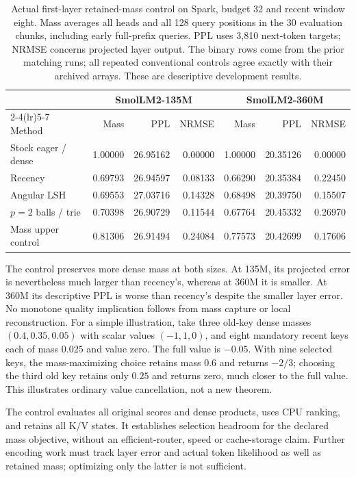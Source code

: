 \documentclass[11pt]{article}
\begin{document}
\begin{table}[htbp]
\centering
\small
\caption{Actual first-layer retained-mass control on Spark, budget 32 and
recent window eight. Mass averages all heads and all 128 query positions in
the 30 evaluation chunks, including early full-prefix queries. PPL uses 3,810
next-token targets; NRMSE concerns projected layer output. The binary rows
come from the prior matching runs; all repeated conventional controls agree
exactly with their archived arrays. These are descriptive development results.}
\begin{tabular}{lrrrrrr}
\toprule
 & \multicolumn{3}{c}{SmolLM2-135M} & \multicolumn{3}{c}{SmolLM2-360M}\\
\cmidrule(lr){2-4}\cmidrule(lr){5-7}
Method & Mass & PPL & NRMSE & Mass & PPL & NRMSE\\
\midrule
Stock eager / dense & 1.00000 & 26.95162 & 0.00000 & 1.00000 & 20.35126 & 0.00000\\
Recency & 0.69793 & 26.94597 & 0.08133 & 0.66290 & 20.35384 & 0.22450\\
Angular LSH & 0.69553 & 27.03716 & 0.14328 & 0.68498 & 20.39750 & 0.15507\\
\(p=2\) balls / trie & 0.70398 & 26.90729 & 0.11544 & 0.67764 & 20.45332 & 0.26970\\
Mass upper control & 0.81306 & 26.91494 & 0.24084 & 0.77573 & 20.42699 & 0.17606\\
\bottomrule
\end{tabular}
\label{tab:actual-oracle}
\end{table}

The control preserves more dense mass at both sizes. At 135M, its projected
error is nevertheless much larger than recency's, whereas at 360M it is smaller.
At 360M its descriptive PPL is worse than recency's despite the smaller layer
error. No monotone quality implication follows from mass capture or local
reconstruction. For a simple illustration, take three old-key dense masses
\((0.4,0.35,0.05)\) with scalar values \((-1,1,0)\), and eight mandatory recent
keys each of mass \(0.025\) and value zero. The full value is \(-0.05\).
With nine selected keys, the mass-maximizing choice retains mass \(0.6\) and
returns \(-2/3\); choosing the third old key retains only \(0.25\) and returns
zero, much closer to the full value. This illustrates ordinary value
cancellation, not a new theorem.

The control evaluates all original scores and dense products, uses CPU ranking,
and retains all K/V states. It establishes selection headroom for the declared
mass objective, without an efficient-router, speed or cache-storage claim.
Further encoding work must track layer error and actual token likelihood as
well as retained mass; optimizing only the latter is not sufficient.
\end{document}
